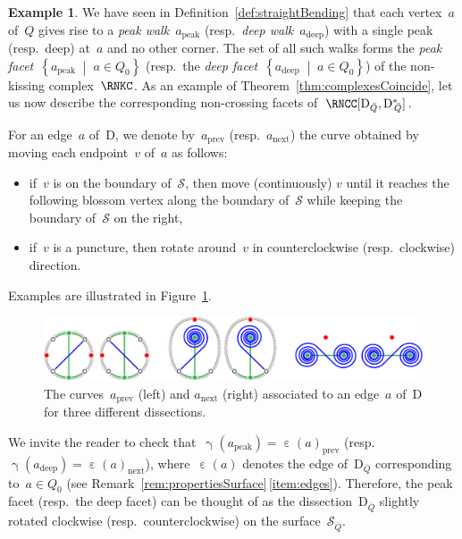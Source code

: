 \documentclass{amsart}
\theoremstyle{definition}
\newtheorem{example}[theorem]{Example}
\newcommand{\set}[2]{\left\{ #1 \;\middle|\; #2 \right\}} %
\newcommand{\fref}[1]{Figure~\ref{#1}} %
\newcommand{\darkblue}{\color{darkblue}} %
\newcommand{\defn}[1]{\textsl{\darkblue #1}} %
\newcommand{\peak}{\mathrm{peak}} %
\newcommand{\deep}{\mathrm{deep}} %
\newcommand{\surface}{\mathcal{S}} %
\newcommand{\dual}{^*} %
\newcommand{\dissection}{\mathrm{D}} %
\newcommand{\curveof}{\operatorname{\gamma}} %
\newcommand{\edgeof}{\operatorname{\varepsilon}} %
\newcommand{\vnext}[1]{#1_{\operatorname{next}}} %
\newcommand{\vprevious}[1]{#1_{\operatorname{prev}}} %
\begin{document}
\begin{example}
\label{exm:peakDeepFacets}
We have seen in Definition~\ref{def:straightBending} that each vertex~$a$ of~$Q$ gives rise to a \defn{peak walk}~$a_\peak$ (resp.~\defn{deep walk}~$a_\deep$) with a single peak (resp.~deep) at~$a$ and no other corner.
The set of all such walks forms the \defn{peak facet}~$\set{a_\peak}{a \in Q_0}$ (resp.~the \defn{deep facet}~$\set{a_\deep}{a \in Q_0}$) of the non-kissing complex~$\RNKC$.
As an example of Theorem~\ref{thm:complexesCoincide}, let us now describe the corresponding non-crossing facets of~$\RNCC[\dissection_{\bar Q}, {{\dissection\dual}\!\!_{\bar Q}}]$.

For an edge~$a$ of~$\dissection$, we denote by~$\vprevious{a}$ (resp.~$\vnext{a}$) the curve obtained by moving each endpoint~$v$ of~$a$ as follows:
\begin{itemize}
\item if~$v$ is on the boundary of~$\surface$, then move (continuously) $v$ until it reaches the following blossom vertex along the boundary of~$\surface$ while keeping the boundary of~$\surface$ on the right,
\item if~$v$ is a puncture, then rotate around~$v$ in counterclockwise (resp.~clockwise) direction.
\end{itemize}
Examples are illustrated in \fref{fig:peakDeep}.
%
\begin{figure}[h]
	\capstart
	\centerline{\includegraphics[scale=.7]{peakDeep}}
	\caption{The curves~$\vprevious{a}$ (left) and $\vnext{a}$ (right) associated to an edge~$a$ of~$\dissection$ for three different dissections.}
	\label{fig:peakDeep}
\end{figure}

We invite the reader to check that~$\curveof(a_\peak) = \vprevious{\edgeof(a)}$ (resp.~$\curveof(a_\deep) = \vnext{\edgeof(a)}$), where~$\edgeof(a)$ denotes the edge of~$\dissection_{\bar Q}$ corresponding to~$a \in Q_0$ (see Remark~\ref{rem:propertiesSurface}\,\eqref{item:edges}).
Therefore, the peak facet (resp.~the deep facet) can be thought of as the dissection~$\dissection_{\bar Q}$ slightly rotated clockwise (resp.~counterclockwise) on the surface~$\surface_{\bar Q}$.
\end{example}
\end{document}
